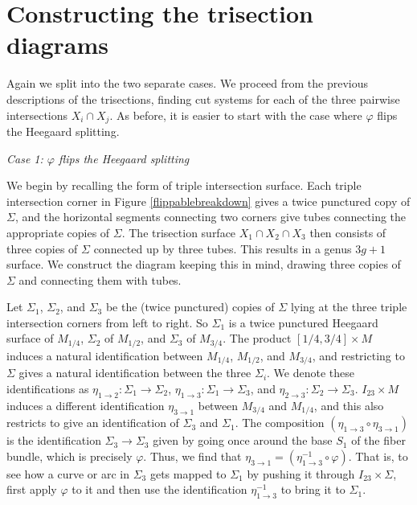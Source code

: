 \documentclass[12pt]{amsart}
\theoremstyle{definition}
\theoremstyle{remark}
\begin{document}
\section{Constructing the trisection diagrams}
\label{sec_diagrams}

Again we split into the two separate cases.
We proceed from the previous descriptions of the trisections, finding cut systems for each of the three pairwise intersections $X_i \cap X_j$.
As before, it is easier to start with the case where $\varphi$ flips the Heegaard splitting.

\smallskip
\noindent\textit{Case 1: $\varphi$ flips the Heegaard splitting}\ \

We begin by recalling the form of triple intersection surface.
Each triple intersection corner in Figure \ref{flippablebreakdown} gives a twice punctured copy of $\Sigma$, and the horizontal segments connecting two corners give tubes connecting the appropriate copies of $\Sigma$.
The trisection surface $X_1 \cap X_2 \cap X_3$ then consists of three copies of $\Sigma$ connected up by three tubes.
This results in a genus $3g+1$ surface.
We construct the diagram keeping this in mind, drawing three copies of $\Sigma$ and connecting them with tubes.


Let $\Sigma_1$, $\Sigma_2$, and $\Sigma_3$ be the (twice punctured) copies of $\Sigma$ lying at the three triple intersection corners from left to right.
So $\Sigma_1$ is a twice punctured Heegaard surface of $M_{1/4}$, $\Sigma_2$ of $M_{1/2}$, and $\Sigma_3$ of $M_{3/4}$.
The product $[1/4, 3/4] \times M$ induces a natural identification between $M_{1/4}$, $M_{1/2}$, and $M_{3/4}$, and restricting to $\Sigma$ gives a natural identification between the three $\Sigma_i$.
We denote these identifications as $\eta_{1 \to 2}\colon \Sigma_1 \to \Sigma_2$, $\eta_{1 \to 3}\colon \Sigma_1 \to \Sigma_3$, and $\eta_{2 \to 3}\colon \Sigma_2 \to \Sigma_3$.
$I_{23} \times M$ induces a different identification $\eta_{3 \to 1}$ between $M_{3/4}$ and $M_{1/4}$, and this also restricts to give an identification of $\Sigma_3$ and $\Sigma_1$.
The composition $(\eta_{1 \to 3} \circ \eta_{3 \to 1})$ is the identification $\Sigma_3 \to \Sigma_3$ given by going once around the base $S_1$ of the fiber bundle, which is precisely $\varphi$.
Thus, we find that $\eta_{3 \to 1} = (\eta_{1 \to 3}^{-1} \circ \varphi)$.
That is, to see how a curve or arc in $\Sigma_3$ gets mapped to $\Sigma_1$ by pushing it through $I_{23} \times \Sigma$, first apply $\varphi$ to it and then use the identification $\eta_{1 \to 3}^{-1}$ to bring it to $\Sigma_1$.
\end{document}

